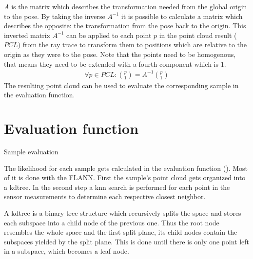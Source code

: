 \documentclass[Thesis.tex]{subfiles}
\begin{document}
$A$ is the matrix which describes the transformation needed from the global origin to the pose. By taking the inverse $A^{-1}$ it is possible to calculate a matrix which describes the opposite: the transformation from the pose back to the origin. This inverted matrix $A^{-1}$ can be applied to each point $p$ in the point cloud result ($PCL$) from the ray trace to transform them to positions which are relative to the origin as they were to the pose. Note that the points need to be homogenous, that means they need to be extended with a fourth component which is $1$.
%
\begin{align}
  \forall p \in PCL: \genfrac{(}{)}{0pt}{0}{p}{1} = A^{-1} \genfrac{(}{)}{0pt}{0}{p}{1}
\end{align}
%
The resulting point cloud can be used to evaluate the corresponding sample in the evaluation function.
%
%
%
\section{Evaluation function}
%
\begin{algorithm}[!htp]
\caption{Sample evaluation}
\label{alg:eval}

\end{algorithm}
The likelihood for each sample gets calculated in the evaluation function (). Most of it is done with the \gls{FLANN}. First the sample's point cloud gets organized into a \gls{kdtree}. In the second step a \gls{knn} search is performed for each point in the sensor measurements to determine each respective closest neighbor. 

A \gls{kdtree} is a binary tree structure which recursively splits the space and stores each subspace into a child node of the previous one. Thus the root node resembles the whole space and the first split plane, its child nodes contain the subspaces yielded by the split plane. This is done until there is only one point left in a subspace, which becomes a leaf node. 
\end{document}

